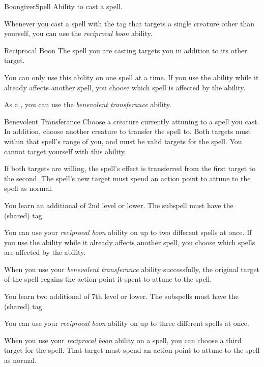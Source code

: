     \begin{feat}{Boongiver}{Spell}
        \featpre Ability to cast a spell.

         Whenever you cast a spell with the  tag that targets a single creature other than yourself, you can use the \textit{reciprocal boon} ability.
        \begin{ability}{Reciprocal Boon}
            The spell you are casting targets you in addition to its other target.

            You can only use this ability on one spell at a time.
            If you use the ability while it already affects another spell, you choose which spell is affected by the ability.
        \end{ability}

         As a , you can use the \textit{benevolent transferance} ability.
        \begin{ability}{Benevolent Transferance}
            Choose a creature currently attuning to a spell you cast.
            In addition, choose another creature to transfer the spell to.
            Both targets must within that spell's range of you, and must be valid targets for the spell.
            You cannot target yourself with this ability.

            If both targets are willing, the spell's effect is transferred from the first target to the second.
            The spell's new target must spend an action point to attune to the spell as normal.
        \end{ability}

         You learn an additional  of 2nd level or lower.
        The subspell must have the  (shared) tag.

         You can use your \textit{reciprocal boon} ability on up to two different spells at once.
        If you use the ability while it already affects another spell, you choose which spells are affected by the ability.

         When you use your \textit{benevolent transferance} ability successfully, the original target of the spell regains the action point it spent to attune to the spell.

         You learn two additional  of 7th level or lower.
        The subspells must have the  (shared) tag.

         You can use your \textit{reciprocal boon} ability on up to three different spells at once.

         When you use your \textit{reciprocal boon} ability on a spell, you can choose a third target for the spell.
        That target must spend an action point to attune to the spell as normal.
    \end{feat}

